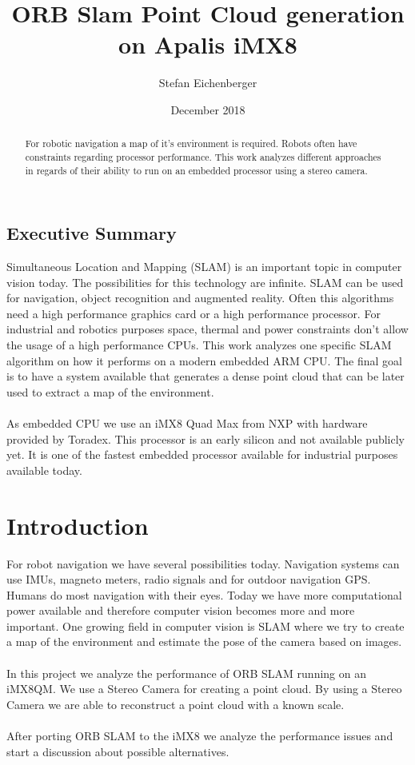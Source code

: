 \documentclass[11pt,a4paper,titlepage,oneside]{report}
\title{ORB Slam Point Cloud generation on Apalis iMX8}
\author{Stefan Eichenberger}
\date{December 2018}
\begin{document}
\maketitle

\begin{abstract}
	For robotic navigation a map of it's environment is required. Robots often have constraints regarding processor performance. This work analyzes different approaches in regards of their ability to run on an embedded processor using a stereo camera.
\end{abstract}

\section*{Executive Summary}
Simultaneous Location and Mapping (SLAM) is an important topic in computer vision today. The possibilities for this technology are infinite. SLAM can be used for navigation, object recognition and augmented reality. Often this algorithms need a high performance graphics card or a high performance processor. For industrial and robotics purposes space, thermal and power constraints don't allow the usage of a high performance CPUs. This work analyzes one specific SLAM algorithm on how it performs on a modern embedded ARM CPU. The final goal is to have a system available that generates a dense point cloud that can be later used to extract a map of the environment.\\\\
As embedded CPU we use an iMX8 Quad Max from NXP with hardware provided by Toradex. This processor is an early silicon and not available publicly yet. It is one of the fastest embedded processor available for industrial purposes available today.\\

\tableofcontents

\chapter{Introduction}
For robot navigation we have several possibilities today. Navigation systems can use IMUs, magneto meters, radio signals and for outdoor navigation GPS. Humans do most navigation with their eyes. Today we have more computational power available and therefore computer vision becomes more and more important. One growing field in computer vision is SLAM where we try to create a map of the environment and estimate the pose of the camera based on images.\\\\
In this project we analyze the performance of ORB SLAM running on an iMX8QM. We use a Stereo Camera for creating a point cloud. By using a Stereo Camera we are able to reconstruct a point cloud with a known scale.\\\\
After porting ORB SLAM to the iMX8 we analyze the performance issues and start a discussion about possible alternatives.
\end{document}
